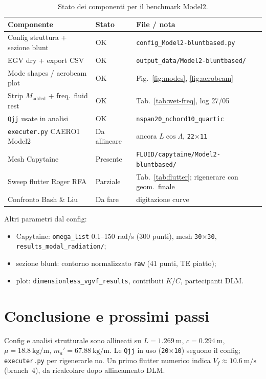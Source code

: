 \documentclass[11pt,a4paper]{article}
\begin{document}
\begin{table}[H]
  \centering
  \caption{Stato dei componenti per il benchmark Model2.}
  \begin{tabular}{lll}
    \toprule
    Componente & Stato & File / nota \\
    \midrule
    Config struttura + sezione blunt & OK & \texttt{config\_Model2-bluntbased.py} \\
    EGV dry + export CSV & OK & \texttt{output\_data/Model2-bluntbased/} \\
    Mode shapes / aerobeam plot & OK & Fig.\ \ref{fig:modes}, \ref{fig:aerobeam} \\
    Strip $M_\mathrm{added}$ + freq.\ fluid rest & OK & Tab.\ \ref{tab:wet-freq}, log 27/05 \\
    \texttt{Qjj} usate in analisi & OK & \texttt{nspan20\_nchord10\_quartic} \\
    \texttt{executer.py} CAERO1 Model2 & Da allineare & ancora $L\cos\Lambda$, \texttt{22$\times$11} \\
    Mesh Capytaine & Presente & \texttt{FLUID/capytaine/Model2-bluntbased/} \\
    Sweep flutter Roger RFA & Parziale & Tab.\ \ref{tab:flutter}; rigenerare con geom.\ finale \\
    Confronto Bash \& Liu & Da fare & digitazione curve \\
    \bottomrule
  \end{tabular}
\end{table}

Altri parametri dal config:
\begin{itemize}
  \item Capytaine: \texttt{omega\_list} 0.1--150 rad/s (300 punti),
    mesh \texttt{30$\times$30}, \texttt{results\_modal\_radiation/};
  \item sezione blunt: contorno normalizzato \texttt{raw} (41 punti, TE piatto);
  \item plot: \texttt{dimensionless\_vgvf\_results}, contributi $K$/$C$, partecipanti DLM.
\end{itemize}

\section{Conclusione e prossimi passi}

Config e analisi strutturale sono allineati su $L=\SI{1.269}{\meter}$,
$c=\SI{0.294}{\meter}$, $\mu=\SI{18.8}{\kilogram\per\meter}$,
$m_a'=\SI{67.88}{\kilogram\per\meter}$. Le \texttt{Qjj} in uso
(\texttt{20$\times$10}) seguono il config; \texttt{executer.py} per rigenerarle no.
Un primo flutter numerico indica $V_f\approx\SI{10.6}{\meter\per\second}$ (branch~4),
da ricalcolare dopo allineamento DLM.
\end{document}
